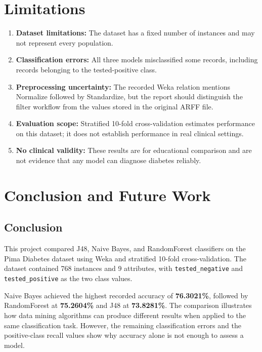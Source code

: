\documentclass[11pt,a4paper]{article}
\begin{document}
\section{Limitations}
\begin{enumerate}
    \item \textbf{Dataset limitations:} The dataset has a fixed number of instances and may not represent every population.
    \item \textbf{Classification errors:} All three models misclassified some records, including records belonging to the tested-positive class.
    \item \textbf{Preprocessing uncertainty:} The recorded Weka relation mentions Normalize followed by Standardize, but the report should distinguish the filter workflow from the values stored in the original ARFF file.
    \item \textbf{Evaluation scope:} Stratified 10-fold cross-validation estimates performance on this dataset; it does not establish performance in real clinical settings.
    \item \textbf{No clinical validity:} These results are for educational comparison and are not evidence that any model can diagnose diabetes reliably.
\end{enumerate}

\section{Conclusion and Future Work}
\subsection{Conclusion}
This project compared J48, Naive Bayes, and RandomForest classifiers on the Pima Diabetes dataset using Weka and stratified 10-fold cross-validation. The dataset contained 768 instances and 9 attributes, with \texttt{tested\_negative} and \texttt{tested\_positive} as the two class values.

Naive Bayes achieved the highest recorded accuracy of \textbf{76.3021\%}, followed by RandomForest at \textbf{75.2604\%} and J48 at \textbf{73.8281\%}. The comparison illustrates how data mining algorithms can produce different results when applied to the same classification task. However, the remaining classification errors and the positive-class recall values show why accuracy alone is not enough to assess a model.
\end{document}
